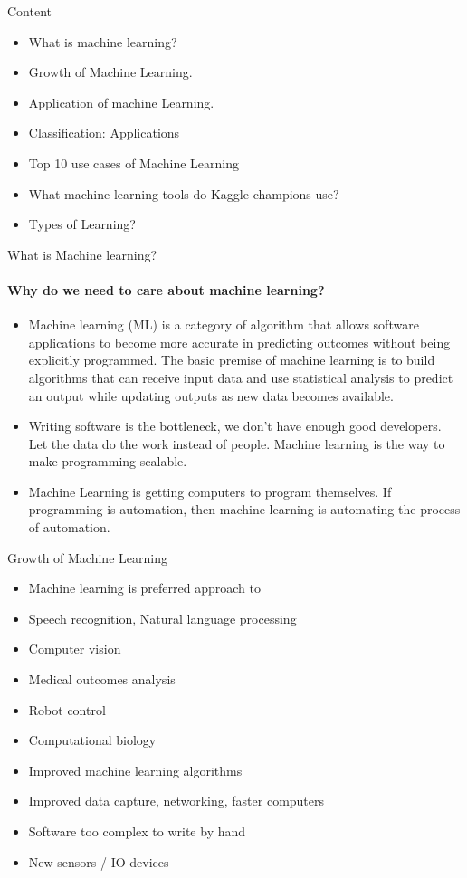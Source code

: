\documentclass[8pt]{beamer}
\begin{document}
\begin{frame}{Content}
\begin{itemize}
\item What is machine learning?
\item Growth of Machine Learning.
\item Application of machine Learning.
\item Classification:  Applications
 \item Top 10 use cases of Machine Learning
 \item What machine learning tools do Kaggle champions use?
    \item Types of Learning?
\end{itemize}
\end{frame}
\begin{frame}{What is Machine learning?}
\framesubtitle{Why do we need to care about machine learning?}
\begin{itemize}
    \item Machine learning (ML) is a category of algorithm that allows software applications to become more accurate in predicting outcomes without being explicitly programmed. The basic premise of machine learning is to build algorithms that can receive input data and use statistical analysis to predict an output while updating outputs as new data becomes available.
    \item Writing software is the bottleneck, we don’t have enough good developers. Let the data do the work instead of people. Machine learning is the way to make programming scalable.
    \item Machine Learning is getting computers to program themselves. If programming is automation, then machine learning is automating the process of automation.
\end{itemize}
\end{frame}
\begin{frame}{Growth of Machine Learning}
   \begin{itemize}
       \item Machine learning is preferred approach to
       \item Speech recognition, Natural language processing
       \item Computer vision
       \item Medical outcomes analysis
    \item Robot control
    \item Computational biology
    \item Improved machine learning algorithms
    \item Improved data capture, networking, faster computers
    \item Software too complex to write by hand
    \item New sensors / IO devices
\end{itemize}
\end{frame}
\end{document}
